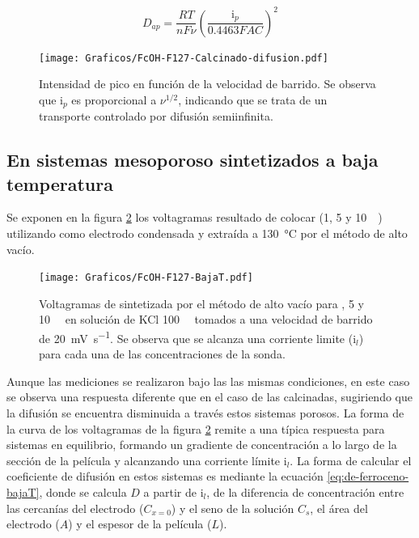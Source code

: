 		 \begin{equation}
					D_{ap}=\frac{RT}{nF\nu}\left(\frac{\text{i}_p}{0.4463FAC}\right)^2
					\label{eq:dapp_bajaT}
			\end{equation}  
	 

		    \begin{figure}[ht]
				\centering
		 	    \texttt{[image: Graficos/FcOH-F127-Calcinado-difusion.pdf]}
		        \caption[i$_p$ en función de $\nu$ para \fc\space]{Intensidad de pico en función de la velocidad de barrido. Se observa que $\text{i}_p$ es proporcional a $\nu ^{1/2}$, indicando que se trata de un transporte controlado por difusión semiinfinita.}
		        \label{fig:difusion_calcinado}
		      	\end{figure}
	      	
	\subsection{En sistemas mesoporoso sintetizados a baja temperatura}

		Se exponen en la figura \ref{fig:fcoh_bajaT} los voltagramas resultado de colocar \fc\space (1, 5 y \SI{10}{\milli\Molar}) utilizando como electrodo \pdmF\space condensada y extraída a \SI{130}{\celsius} por el método de alto vacío. 
			\begin{figure}[ht]
				\centering
		 	    \texttt{[image: Graficos/FcOH-F127-BajaT.pdf]}
		        \caption[Voltagrama para \fc\space en \pdm\space de baja temperatura]{Voltagramas de \pdmF\space sintetizada por el método de alto vacío para \fc{}, 5 y \SI{10}{\milli\Molar} en solución de KCl \SI{100}{\milli\Molar} tomados a una velocidad de barrido de \SI{20}{\milli\volt\per\second}. Se observa que se alcanza una corriente limite ($\text{i}_l$) para cada una de las concentraciones de la sonda.}
		        \label{fig:fcoh_bajaT}
		      	\end{figure}
		
		Aunque las mediciones se realizaron bajo las las mismas condiciones, en este caso se observa una respuesta diferente que en el caso de las \pdmF\space calcinadas, sugiriendo que la difusión se encuentra disminuida a través estos sistemas porosos. La forma de la curva de los voltagramas de la figura \ref{fig:fcoh_bajaT} remite a una típica respuesta para sistemas en equilibrio, formando un gradiente de concentración a lo largo de la sección de la película y alcanzando una corriente límite $\text{i}_l$. 
		La forma de calcular el coeficiente de difusión en estos sistemas es mediante la ecuación \ref{eq:de-ferroceno-bajaT}, donde se calcula $D$ a partir de $\text{i}_l$, de la diferencia de concentración entre las cercanías del electrodo ($C_{x=0}$) y el seno de la solución $C_s$, el área del electrodo ($A$) y el espesor de la película ($L$).

